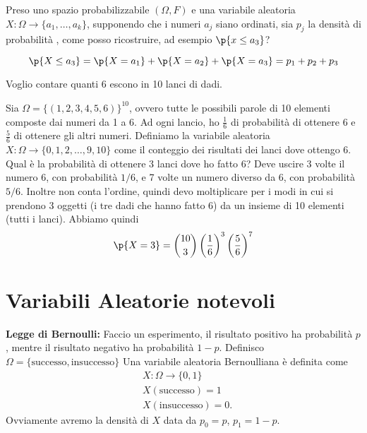 \begin{exmp}
    Preso uno spazio probabilizzabile $ (\Omega, F) $ e una variabile aleatoria
    $ X : \Omega \to \{ a_1, \dots, a_k \} $, supponendo che i numeri $ a_j $
    siano ordinati, sia $ p_j $ la densit\`a  di probabilit\`a , come posso
    ricostruire, ad esempio $ \p{x \leq a_3} $?

    \begin{equation*}
        \p{X \leq a_3} = \p{X = a_1} + \p{X = a_2} + \p{X = a_3}=
        p_1+p_2+p_3
    \end{equation*}
\end{exmp}


\begin{exmp}
    Voglio contare quanti 6 escono in 10 lanci di dadi.
    
    Sia $ \Omega = \{ (1, 2, 3, 4, 5, 6)\}^{10} $, ovvero tutte le possibili
    parole di 10 elementi composte dai numeri da 1 a 6. Ad ogni lancio, ho $
    \frac{1}{6} $ di probabilit\`a  di ottenere 6 e $ \frac{5}{6} $ di ottenere
    gli altri numeri. Definiamo la variabile aleatoria $ X : \Omega \to \{ 0, 1,
    2, \dots, 9, 10 \} $ come il conteggio dei risultati dei lanci dove ottengo
    6. Qual \`e la probabilit\`a  di ottenere 3 lanci dove ho fatto 6? Deve
    uscire 3 volte il numero 6, con probabilit\`a $1/6$, e 7 volte un numero
    diverso da 6, con probabilit\`a $5/6$. Inoltre non conta l'ordine, quindi
    devo moltiplicare per i modi in cui si prendono 3 oggetti (i tre dadi che
    hanno fatto 6) da un insieme di 10 elementi (tutti i lanci). Abbiamo quindi
    \begin{equation*}
        \p{X = 3} = \binom{10}{3} \left(\dfrac{1}{6}\right)^3 \left(\dfrac{5}{6}\right)^7 
    \end{equation*}
\end{exmp}

\section{Variabili Aleatorie notevoli}

\begin{defn}
    \textbf{Legge di Bernoulli:}
    Faccio un esperimento, il risultato positivo ha probabilit\`a  $ p $, mentre
    il risultato negativo ha probabilit\`a  $ 1 - p $. Definisco $ \Omega =
    \{\text{successo},\text{insuccesso}\}$ Una variabile aleatoria Bernoulliana
    \`e definita come
    \begin{eqnarray*}
    & X : \Omega \to \{0,1\}\\
    &X(\text{successo})=1 \\
    &X(\text{insuccesso})=0.
    \end{eqnarray*}
    Ovviamente avremo la densit\`a di $X$ data da $p_0=p$, $p_1=1-p$.
\end{defn}

